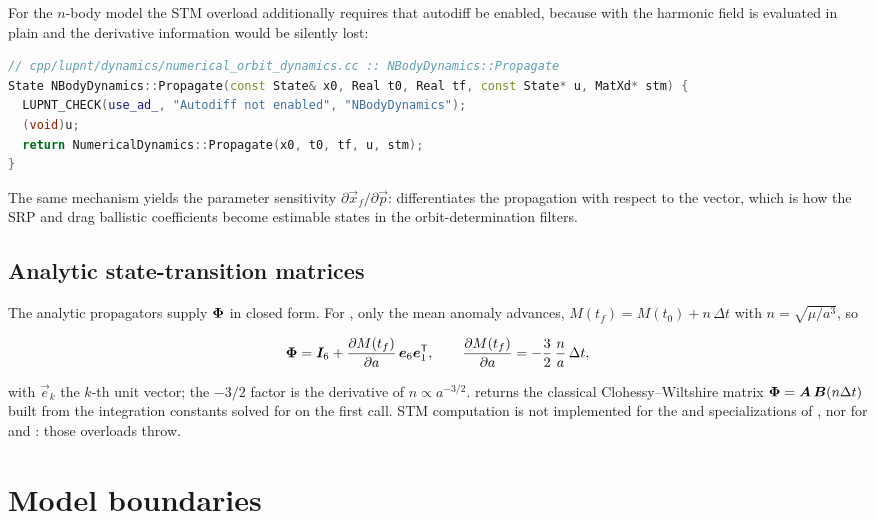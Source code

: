 For the $n$-body model the STM overload additionally requires that autodiff be
enabled, because with  the harmonic field is evaluated in
plain  and the derivative information would be silently lost:

\begin{lstlisting}[language=cpp, caption={STM requires the autodiff path.}, label={lst:dyn-stm-check}]
// cpp/lupnt/dynamics/numerical_orbit_dynamics.cc :: NBodyDynamics::Propagate
State NBodyDynamics::Propagate(const State& x0, Real t0, Real tf, const State* u, MatXd* stm) {
  LUPNT_CHECK(use_ad_, "Autodiff not enabled", "NBodyDynamics");
  (void)u;
  return NumericalDynamics::Propagate(x0, t0, tf, u, stm);
}
\end{lstlisting}

The same mechanism yields the parameter sensitivity
$\partial\vec{x}_f/\partial\vec{p}$:  differentiates the
propagation with respect to the  vector, which is how the SRP and
drag ballistic coefficients become estimable states in the orbit-determination
filters.

\subsection{Analytic state-transition matrices}

The analytic propagators supply $\bm{\Phi}$ in closed form. For
, only the mean anomaly advances,
$M(t_f) = M(t_0) + n\,\Delta t$ with $n=\sqrt{\mu/a^3}$, so

\begin{equation}
  \label{eq:dyn-kep-stm}
  \bm{\Phi} = \bm{I}_{6} + \frac{\partial M(t_f)}{\partial a}\,
  \bm{e}_6\bm{e}_1^{\mathsf{T}},
  \qquad
  \frac{\partial M(t_f)}{\partial a} = -\frac{3}{2}\,\frac{n}{a}\,\Delta t ,
\end{equation}

with $\vec{e}_k$ the $k$-th unit vector; the $-3/2$ factor is the derivative of
$n\propto a^{-3/2}$.  returns the classical
Clohessy--Wiltshire matrix
$\bm{\Phi} = \bm{A}\,\bm{B}(n\Delta t)$ built from the integration constants
solved for on the first call. STM computation is not implemented for the
 and  specializations of
, nor for  and
: those overloads throw.

\section{Model boundaries}
\label{sec:dyn-boundaries}

